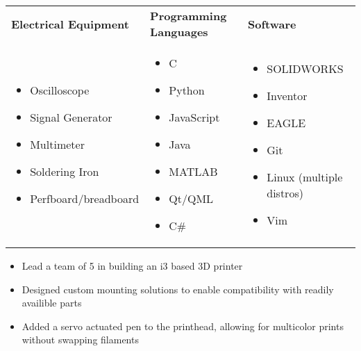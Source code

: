 \documentclass{resume}
\author{Jasper Chan}
\begin{document}
\maketitle

\TechnicalSkills
\begin{table}[H]
	\centering
	\begin{tabularx}{\textwidth}{X X X}
		\textbf{Electrical Equipment} & \textbf{Programming Languages} & \textbf{Software} \\
		\begin{itemize}
			\item Oscilloscope
			\item Signal Generator
			\item Multimeter
			\item Soldering Iron
			\item Perfboard/breadboard
		\end{itemize} &
		\begin{itemize}
			\item C
			\item Python
			\item JavaScript
			\item Java
			\item MATLAB
			\item Qt/QML
			\item C\#
		\end{itemize} &
		\begin{itemize}
			\item SOLIDWORKS
			\item Inventor
			\item EAGLE
			\item Git
			\item Linux (multiple distros)
			\item Vim
		\end{itemize}
	\end{tabularx}
\end{table}
\vspace{-4em} %
\CoopStatus


\TechnicalProjects

\begin{itemize}
	\item Lead a team of 5 in building an i3 based 3D printer
	\item Designed custom mounting solutions to enable compatibility with readily availible parts
	\item Added a servo actuated pen to the printhead, allowing for multicolor prints without swapping filaments
\end{itemize}
\end{document}
